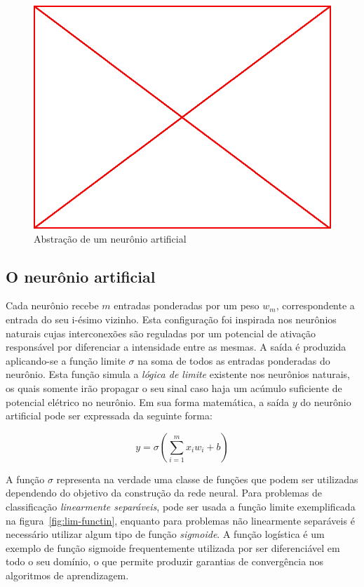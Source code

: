 \begin{figure}
  \caption{Abstração de um neurônio artificial}
  \begin{center}
    \includegraphics[scale=0.5]{placeholder}
  \end{center}
\end{figure}

\subsection{O neurônio artificial}

Cada neurônio recebe $m$ entradas ponderadas por um peso $w_m$,
correspondente a entrada do seu i-ésimo vizinho. Esta configuração foi
inspirada nos neurônios naturais cujas interconexões são reguladas por um
potencial de ativação responsável por diferenciar a intensidade entre as
mesmas. A saída é produzida aplicando-se a função limite $\sigma$ na soma
de todos as entradas ponderadas do neurônio. Esta função simula a \emph{lógica
  de limite} existente nos neurônios naturais, os quais somente irão propagar o
seu sinal caso haja um acúmulo suficiente de potencial elétrico no neurônio. Em
sua forma matemática, a saída $y$ do neurônio artificial pode ser expressada da
seguinte forma:

$$y=\sigma(\sum_{i=1}^{m}x_i w_i + b)$$

A função $\sigma$ representa na verdade uma classe de funções que podem ser
utilizadas dependendo do objetivo da construção da rede neural. Para problemas
de classificação \emph{linearmente separáveis}, pode ser usada a função limite
exemplificada na figura~\ref{fig:lim-functin}, enquanto para problemas não
linearmente separáveis é necessário utilizar algum tipo de função
\emph{sigmoide}. A função logística é um exemplo de função sigmoide
frequentemente utilizada por ser diferenciável em todo o seu domínio, o que
permite produzir garantias de convergência nos algoritmos de aprendizagem.


